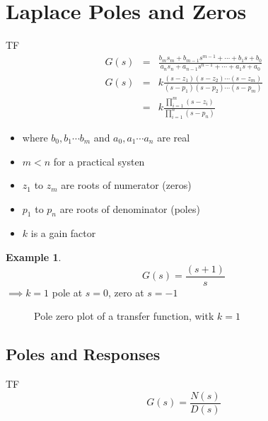\documentclass[11pt]{article} %
\theoremstyle{definition}
\newtheorem{example}{Example}[subsection]
\begin{document}
\section{Laplace Poles and Zeros}
	TF
	\begin{eqnarray}
		G(s) &=& \frac{b_ms_m + b_{m-1}s^{m-1}+\cdots + b_1s+b_0}{a_ns_n + a_{n-1}s^{n-1}+\cdots + a_1s+a_0} \nonumber \\
		G(s) &=& k \frac{(s-z_1)(s-z_2)\cdots(s-z_m)}{(s-p_1)(s-p_2)\cdots(s-p_m)} \nonumber \\
		&=& k\frac{\prod\limits_{i=1}^m(s-z_i)}{\prod\limits_{i=1}^n(s-p_n)}
	\end{eqnarray}

	\begin{itemize}
		\item where $b_0, b_1 \cdots b_m$ and $a_0, a_1 \cdots a_n$ are real
		\item $m<n$ for a practical systen
		\item $z_1$ to $z_m$ are roots of numerator (zeros)
		\item $p_1$ to $p_n$ are roots of denominator (poles)
		\item $k$ is a gain factor
	\end{itemize}

	\begin{example}
		\begin{equation}
			G(s) = \frac{(s+1)}{s}
		\end{equation}
		$\implies k = 1$ pole at $s=0$, zero at $s=-1$
	\end{example}
	\begin{figure}[h]
		\centering
		\caption{Pole zero plot of a transfer function, witk $k=1$}
	\end{figure}

\subsection{Poles and Responses}
	TF
	\begin{equation}
		G(s) = \frac{N(s)}{D(s)}
	\end{equation}
\end{document}
